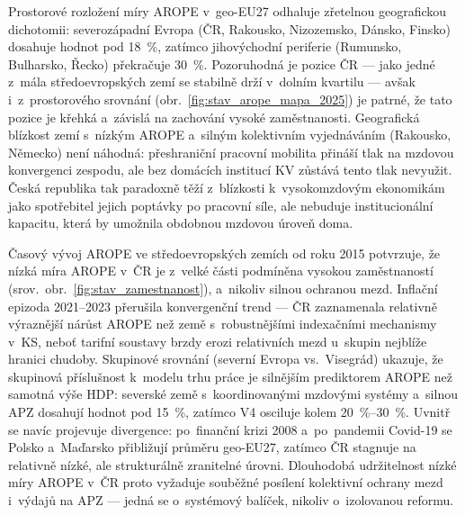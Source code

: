 Prostorové rozložení míry \ac{AROPE} v~\acs{geo-EU27} odhaluje zřetelnou geografickou dichotomii: severozápadní Evropa (\ac{ČR}, Rakousko, Nizozemsko, Dánsko, Finsko) dosahuje hodnot pod \SI{18}{\percent}, zatímco jihovýchodní periferie (Rumunsko, Bulharsko, Řecko) překračuje \SI{30}{\percent}.
Pozoruhodná je pozice ČR --- jako jedné z~mála středoevropských zemí se stabilně drží v~dolním kvartilu --- avšak i~z~prostorového srovnání (obr.~\ref{fig:stav_arope_mapa_2025}) je patrné, že tato pozice je křehká a~závislá na zachování vysoké zaměstnanosti.
Geografická blízkost zemí s~nízkým \ac{AROPE} a~silným kolektivním vyjednáváním (Rakousko, Německo) není náhodná: přeshraniční pracovní mobilita přináší tlak na mzdovou konvergenci zespodu, ale bez domácích institucí \ac{KV} zůstává tento tlak nevyužit.
Česká republika tak paradoxně těží z~blízkosti k~vysokomzdovým ekonomikám jako spotřebitel jejich poptávky po pracovní síle, ale nebuduje institucionální kapacitu, která by umožnila obdobnou mzdovou úroveň doma.

Časový vývoj \ac{AROPE} ve středoevropských zemích od roku 2015 potvrzuje, že nízká míra \ac{AROPE} v~ČR je z~velké části podmíněna vysokou zaměstnaností (srov.~obr.~\ref{fig:stav_zamestnanost}), a~nikoliv silnou ochranou mezd.
Inflační epizoda 2021--2023 přerušila konvergenční trend --- ČR zaznamenala relativně výraznější nárůst \ac{AROPE} než země s~robustnějšími indexačními mechanismy v~\ac{KS}, neboť tarifní soustavy brzdy erozi relativních mezd u~skupin nejblíže hranici chudoby.
Skupinové srovnání (severní Evropa vs.~Visegrád) ukazuje, že skupinová příslušnost k~modelu trhu práce je silnějším prediktorem \ac{AROPE} než samotná výše \ac{HDP}: severské země s~koordinovanými mzdovými systémy a~silnou \ac{APZ} dosahují hodnot pod \SI{15}{\percent}, zatímco V4 osciluje kolem \SIrange{20}{30}{\percent}.
Uvnitř  se navíc projevuje divergence: po~finanční krizi 2008 a~po~pandemii Covid-19 se Polsko a~Maďarsko přibližují průměru \acs{geo-EU27}, zatímco \ac{ČR} stagnuje na relativně nízké, ale strukturálně zranitelné úrovni.
Dlouhodobá udržitelnost nízké míry \ac{AROPE} v~ČR proto vyžaduje souběžné posílení kolektivní ochrany mezd i~výdajů na \ac{APZ} --- jedná se o~systémový balíček, nikoliv o~izolovanou reformu.


